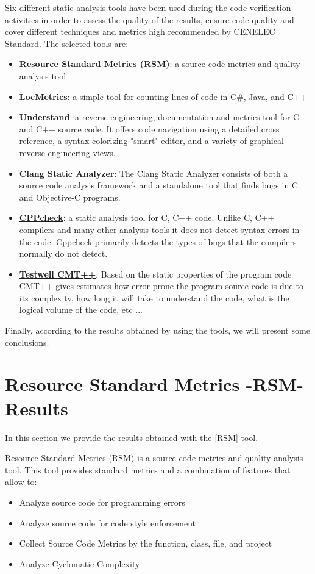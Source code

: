 Six different static analysis tools have been used during the code verification activities in order to assess the quality of the results, ensure code quality and cover different techniques and metrics high recommended by CENELEC Standard. The selected tools are:
\begin{itemize}
\item \textbf{Resource Standard Metrics (\href{http://msquaredtechnologies.com/m2rsm/}{RSM})}: a source code metrics and quality analysis tool
\item \textbf{\href{http://www.locmetrics.com/}{LocMetrics}}: a simple tool for counting lines of code in C\#, Java, and C++
\item \textbf{\href{http://www.scitools.com/}{Understand}}: a reverse engineering, documentation and metrics tool for C and C++ source code. It offers code navigation using a detailed cross reference, a syntax colorizing "smart" editor, and a variety of graphical reverse engineering views.                          
\item \textbf{\href{http://clang-analyzer.llvm.org/}{Clang Static Analyzer}}: The Clang Static Analyzer consists of both a source code analysis framework and a standalone tool that finds bugs in C and Objective-C programs.
\item \textbf{\href{http://cppcheck.sourceforge.net/}{CPPcheck}}: a static analysis tool for C, C++ code. Unlike C, C++ compilers and many other analysis tools it does not detect syntax errors in the code. Cppcheck primarily detects the types of bugs that the compilers normally do not detect. 
\item \textbf{\href{http://www.verifysoft.com/en_cmtx.html}{Testwell CMT++}}: Based on the static properties of the program code CMT++ gives estimates how error prone the program source code is due to its complexity, how long it will take to understand the code, what is the logical volume of the code, etc ...
\end{itemize}


Finally, according to the results obtained by using the tools, we will present some conclusions.

\section{Resource Standard Metrics -RSM- Results}
In this section we provide the results obtained with the \href{http://msquaredtechnologies.com/m2rsm/}{[RSM]} tool.

Resource Standard Metrics (RSM) is a source code metrics and quality analysis tool. This tool provides standard metrics and a combination of features that allow to:
\begin{itemize}
\item Analyze source code for programming errors
\item Analyze source code for code style enforcement
\item Collect Source Code Metrics by the function, class, file, and project
\item Analyze Cyclomatic Complexity
\end{itemize}

